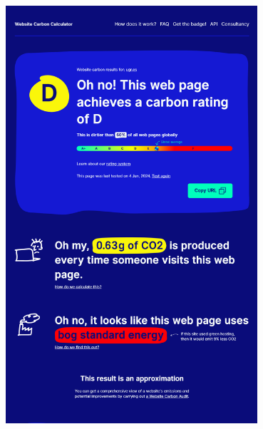\documentclass[12pt,a4paper]{report}
\begin{document}
\begin{center}
  \includegraphics[width=0.7\textwidth]{imagenes/WCC_2.png}
  \label{fig:wccnota}
\end{center}
\end{document}
